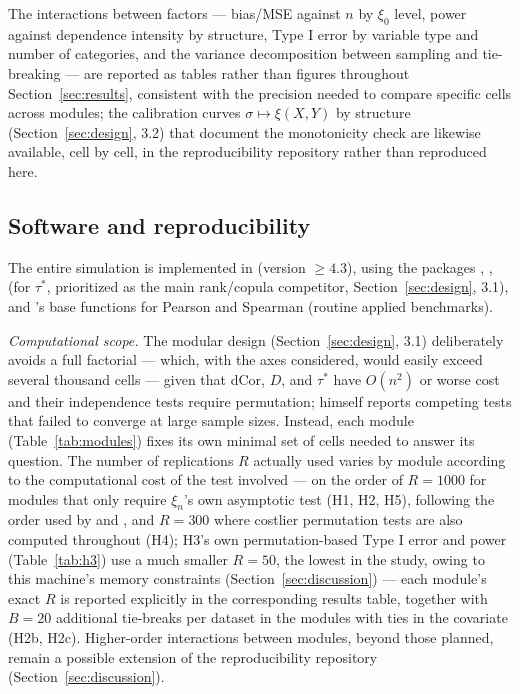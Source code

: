 \documentclass[article]{ajs}
\begin{document}
The interactions between factors --- bias/MSE against $n$ by $\xi_0$
level, power against dependence intensity by structure, Type I error by
variable type and number of categories, and the variance decomposition
between sampling and tie-breaking --- are reported as tables rather
than figures throughout Section~\ref{sec:results}, consistent with the
precision needed to compare specific cells across modules; the
calibration curves $\sigma \mapsto \xi(X,Y)$ by structure
(Section~\ref{sec:design}, 3.2) that document the monotonicity check
are likewise available, cell by cell, in the reproducibility
repository rather than reproduced here.

\subsection{Software and reproducibility}

The entire simulation is implemented in  (version
$\ge 4.3$), using the packages  \citep[for $\xi_n$; the same
package used by][]{chatterjee2021,dalitz2024},  \citep[for
dCor; by the same authors who proposed it,][]{szekely2007},
 (for $\tau^\ast$, prioritized as the main rank/copula
competitor, Section~\ref{sec:design}, 3.1), and 's base
functions for Pearson and Spearman (routine applied benchmarks).

\emph{Computational scope.} The modular design (Section~\ref{sec:design},
3.1) deliberately avoids a full factorial --- which, with the axes
considered, would easily exceed several thousand cells --- given that
dCor, $D$, and $\tau^\ast$ have $O(n^2)$ or worse cost and their
independence tests require permutation; \citet{chatterjee2021} himself
reports competing tests that failed to converge at large sample sizes.
Instead, each module (Table~\ref{tab:modules}) fixes its own minimal
set of cells needed to answer its question. The number of replications
$R$ actually used varies by module according to the computational cost
of the test involved --- on the order of $R=1000$ for modules that only
require $\xi_n$'s own asymptotic test (H1, H2, H5), following the order
used by \citealp{gao2024} and \citealp{dalitz2024}, and $R=300$ where
costlier permutation tests are also computed throughout (H4); H3's own
permutation-based Type I error and power (Table~\ref{tab:h3}) use a
much smaller $R=50$, the lowest in the study, owing to this machine's
memory constraints (Section~\ref{sec:discussion}) --- each module's
exact $R$ is reported explicitly in the corresponding results table,
together with $B=20$ additional tie-breaks per dataset in the modules
with ties in the covariate (H2b, H2c). Higher-order interactions
between modules, beyond those planned, remain a possible extension of
the reproducibility repository (Section~\ref{sec:discussion}).
\end{document}
